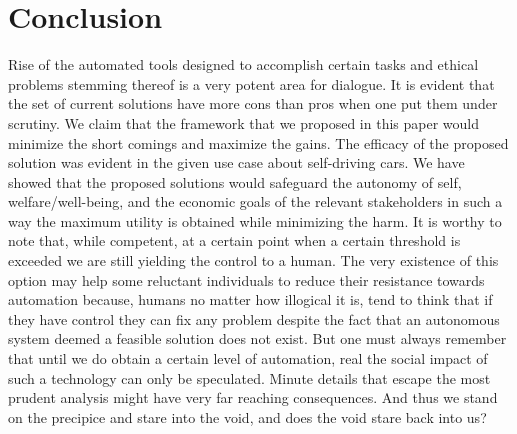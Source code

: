 \section{Conclusion}
\label{sec:-conc}
Rise of the automated tools designed to accomplish certain tasks and ethical problems stemming thereof is a very potent area for dialogue. It is evident that the set of current solutions have more cons than pros when one put them under scrutiny. We claim that the framework that we proposed in this paper would minimize the short comings and maximize the gains. The efficacy of the proposed solution was evident in the given use case about self-driving cars. We have showed that the proposed solutions would safeguard the autonomy of self, welfare/well-being, and the economic goals of the relevant stakeholders in such a way the maximum utility is obtained while minimizing the harm. It is worthy to note that, while competent, at a certain point when a certain threshold is exceeded we are still yielding the control to a human. The very existence of this option may help some reluctant individuals to reduce their resistance towards automation because, humans no matter how illogical it is, tend to think that if they have control they can fix any problem despite the fact that an autonomous system deemed a feasible solution does not exist. But one must always remember that until we do obtain a certain level of automation, real the social impact of such a technology can only be speculated. Minute details that escape the most prudent analysis might have very far reaching consequences. And thus we stand on the precipice and stare into the void, and does the void stare back into us?

